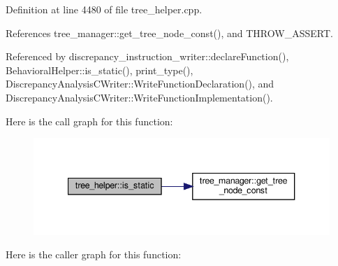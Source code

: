 Definition at line 4480 of file tree\+\_\+helper.\+cpp.



References tree\+\_\+manager\+::get\+\_\+tree\+\_\+node\+\_\+const(), and T\+H\+R\+O\+W\+\_\+\+A\+S\+S\+E\+RT.



Referenced by discrepancy\+\_\+instruction\+\_\+writer\+::declare\+Function(), Behavioral\+Helper\+::is\+\_\+static(), print\+\_\+type(), Discrepancy\+Analysis\+C\+Writer\+::\+Write\+Function\+Declaration(), and Discrepancy\+Analysis\+C\+Writer\+::\+Write\+Function\+Implementation().

Here is the call graph for this function\+:
\nopagebreak
\begin{figure}[H]
\begin{center}
\leavevmode
\includegraphics[width=340pt]{d7/d99/classtree__helper_a962b5e392c5e3b7c9f461c4460ee6f8b_cgraph}
\end{center}
\end{figure}
Here is the caller graph for this function\+:
\nopagebreak
